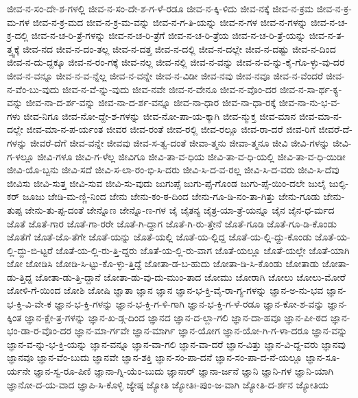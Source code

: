{ಜೀವ-ನ-ಸಂ-ದೇ-ಶ-ಗಳಲ್ಲಿ
ಜೀವ-ನ-ಸಂ-ದೇ-ಶ-ಗ-ಳೆ-ರಡೂ
ಜೀವ-ನ-ಕ್ಕಿ-ಳಿದು
ಜೀವ-ನಕ್ಕೆ
ಜೀವ-ನ-ಕ್ರಮ
ಜೀವ-ನ-ಕ್ರ-ಮ-ಗಳ
ಜೀವ-ನ-ಕ್ರ-ಮದ
ಜೀವ-ನ-ಕ್ರ-ಮ-ವನ್ನು
ಜೀವ-ನ-ಗ-ತಿ-ಯನ್ನು
ಜೀವ-ನ-ಗಳ
ಜೀವ-ನ-ಗಳನ್ನು
ಜೀವ-ನ-ಚ-ಕ್ರ-ದಲ್ಲಿ
ಜೀವ-ನ-ಚ-ರಿ-ತ್ರೆ-ಗಳನ್ನು
ಜೀವ-ನ-ಚ-ರಿ-ತ್ರೆಗೆ
ಜೀವ-ನ-ಚ-ರಿ-ತ್ರೆಯ
ಜೀವ-ನ-ಚ-ರಿ-ತ್ರೆ-ಯನ್ನು
ಜೀವ-ನ-ತ-ತ್ತ್ವಕ್ಕೆ
ಜೀವ-ನದ
ಜೀವ-ನ-ದಂ-ತಲ್ಲ
ಜೀವ-ನ-ದತ್ತ
ಜೀವ-ನ-ದಲ್ಲಿ
ಜೀವ-ನ-ದಲ್ಲೇ
ಜೀವ-ನ-ದಷ್ಟು
ಜೀವ-ನ-ದಿಂದ
ಜೀವ-ನ-ದು-ದ್ದಕ್ಕೂ
ಜೀವ-ನ-ರಂ-ಗಕ್ಕೆ
ಜೀವ-ನಲ್ಲ
ಜೀವ-ನಲ್ಲಿ
ಜೀವ-ನ-ವನ್ನು
ಜೀವ-ನ-ವ-ನ್ನು-ಕೈ-ಗೊ-ಳ್ಳು-ವು-ದರ
ಜೀವ-ನ-ವನ್ನೂ
ಜೀವ-ನ-ವ-ನ್ನೆಲ್ಲ
ಜೀವ-ನ-ವನ್ನೇ
ಜೀವ-ನ-ವಿಡೀ
ಜೀವ-ನವು
ಜೀವ-ನವೂ
ಜೀವ-ನ-ವೆಂದರೆ
ಜೀವ-ನ-ವೆಂ-ಬು-ವುದು
ಜೀವ-ನ-ವೆ-ನ್ನು-ವುದು
ಜೀವ-ನವೇ
ಜೀವ-ನ-ವೇನೂ
ಜೀವ-ನ-ವೊಂ-ದರ
ಜೀವ-ನ-ಸಾ-ರ್ಥ-ಕ್ಯ-ವನ್ನು
ಜೀವ-ನಾ-ದ-ರ್ಶ-ವನ್ನು
ಜೀವ-ನಾ-ದ-ರ್ಶ-ವನ್ನೂ
ಜೀವ-ನಾ-ಧಾರ
ಜೀವ-ನಾ-ಧಾ-ರಕ್ಕೆ
ಜೀವ-ನಾ-ನು-ಭ-ವ-ಗಳು
ಜೀವ-ನಿಗೂ
ಜೀವ-ನೋ-ದ್ದೇ-ಶ-ಗಳನ್ನು
ಜೀವ-ನೋ-ಪಾ-ಯ-ಕ್ಕಾಗಿ
ಜೀವ-ನ್ಮುಕ್ತ
ಜೀವ-ಮಾನ
ಜೀವ-ಮಾ-ನ-ದಲ್ಲೇ
ಜೀವ-ಮಾ-ನ-ಪ-ರ್ಯಂತ
ಜೀವರ
ಜೀವ-ರಂತೆ
ಜೀವ-ರಲ್ಲಿ
ಜೀವ-ರಲ್ಲೂ
ಜೀವ-ರಾ-ದರೆ
ಜೀವ-ರಿಗೆ
ಜೀವರೆ-ದೆ-ಗಳನ್ನು
ಜೀವರೆ-ದೆಗೆ
ಜೀವ-ವನ್ನೇ
ಜೀವವು
ಜೀವ-ಸ-ತ್ವ-ದಂತೆ
ಜೀವಾ-ತ್ಮನು
ಜೀವಾ-ತ್ಮನೂ
ಜೀವಿ
ಜೀವಿ-ಗಳನ್ನು
ಜೀವಿ-ಗ-ಳಲ್ಲೂ
ಜೀವಿ-ಗಳೂ
ಜೀವಿ-ಗ-ಳೆಲ್ಲ
ಜೀವಿಗೂ
ಜೀವಿ-ತಾ-ವ-ಧಿಯ
ಜೀವಿ-ತಾ-ವ-ಧಿ-ಯಲ್ಲಿ
ಜೀವಿ-ತಾ-ವ-ಧಿ-ಯಿಡೀ
ಜೀವಿ-ಯೊ-ಬ್ಬನು
ಜೀವಿ-ಸದೆ
ಜೀವಿ-ಸ-ಲಾ-ರಂ-ಭಿ-ಸಿ-ದರು
ಜೀವಿ-ಸಿ-ದ-ವ-ರಲ್ಲ
ಜೀವಿ-ಸಿ-ದ-ವರು
ಜೀವಿ-ಸಿ-ದೆವು
ಜೀವಿಸು
ಜೀವಿ-ಸುತ್ತ
ಜೀವಿ-ಸುವ
ಜೀವಿ-ಸು-ವುದು
ಜುಗುಪ್ಸೆ
ಜುಗು-ಪ್ಸೆ-ಗೊಂಡ
ಜುಗು-ಪ್ಸೆ-ಯಿಂ-ದಲೇ
ಜುಲೈ
ಜುಲ್ಫಿ-ಕರ್
ಜೂಜು
ಜೇಡಿ-ಮ-ಣ್ಣಿ-ನಿಂದ
ಜೇನು
ಜೇನು-ಕಂ-ಠ-ದಿಂದ
ಜೇನು-ಗೂ-ಡಿ-ನಂ-ತಾ-ಗಿತ್ತು
ಜೇನು-ಗೂಡು
ಜೇನು-ತುಪ್ಪ
ಜೇನು-ತು-ಪ್ಪ-ದಂತೆ
ಜೇನ್ನೊಣ
ಜೇನ್ನೊ-ಣ-ಗಳ
ಜೈ
ಜೈತನ್ಯ
ಜೈತ್ರ-ಯಾ-ತ್ರೆ-ಯನ್ನೂ
ಜೈನ
ಜೈನ-ಧ-ರ್ಮದ
ಜೊತೆ
ಜೊತೆ-ಗಾರ
ಜೊತೆ-ಗಾ-ರರೇ
ಜೊತೆ-ಗಿ-ದ್ದಾಗ
ಜೊತೆ-ಗಿ-ರು-ತ್ತೇನೆ
ಜೊತೆ-ಗೂಡಿ
ಜೊತೆ-ಗೂ-ಡಿ-ಕೊಂಡು
ಜೊತೆಗೆ
ಜೊತೆ-ಜೊ-ತೆಗೇ
ಜೊತೆ-ಯನ್ನು
ಜೊತೆ-ಯಲ್ಲಿ
ಜೊತೆ-ಯ-ಲ್ಲಿದ್ದ
ಜೊತೆ-ಯ-ಲ್ಲಿ-ದ್ದು-ಕೊಂಡು
ಜೊತೆ-ಯ-ಲ್ಲಿ-ದ್ದು-ಬಿ-ಟ್ಟರೆ
ಜೊತೆ-ಯ-ಲ್ಲಿ-ರು-ತ್ತಿ-ದ್ದರು
ಜೊತೆ-ಯ-ಲ್ಲಿ-ರು-ವಾಗ
ಜೊತೆ-ಯಲ್ಲೂ
ಜೊತೆ-ಯಲ್ಲೇ
ಜೊತೆ-ಯಾಗಿ
ಜೋ
ಜೋಡಿಸಿ
ಜೋಡಿ-ಸಿ-ಟ್ಟು-ಕೊ-ಳ್ಳು-ತ್ತಿದ್ದೆ
ಜೋತಾ-ಡ-ಬ-ಹುದು
ಜೋತಾ-ಡಿ-ಸಿ-ಕೊಂಡು
ಜೋತಾಡು
ಜೋತಾ-ಡು-ತ್ತಿದ್ದ
ಜೋತಾ-ಡು-ತ್ತಿ-ದ್ದಾನೆ
ಜೋತಾ-ಡು-ವು-ದು-ಮುಂ-ತಾದ
ಜೋಮು
ಜೋರಾಗಿ
ಜೋಲು
ಜೋಲು-ಮೋರೆ
ಜೋಳಿ-ಗೆ-ಯಿಂದ
ಜೋಶಿ
ಜೋಷಿ
ಜ್ಞಾತಾ
ಜ್ಞಾನ
ಜ್ಞಾನ
ಜ್ಞಾನ-ಭ-ಕ್ತಿ-ವೈ-ರಾ-ಗ್ಯ-ಗಳನ್ನು
ಜ್ಞಾನ-ಅ-ನು-ಭವ
ಜ್ಞಾನ-ಭ-ಕ್ತಿ-ವಿ-ವೇ-ಕ
ಜ್ಞಾನ-ಭ-ಕ್ತಿ-ಗಳನ್ನು
ಜ್ಞಾನ-ಭ-ಕ್ತಿ-ಗ-ಳಿ-ಗಾಗಿ
ಜ್ಞಾನ-ಭ-ಕ್ತಿ-ಗ-ಳೆ-ರಡೂ
ಜ್ಞಾನ-ಕೋ-ಶ-ವನ್ನು
ಜ್ಞಾನ-ಕ್ಕಿಂತ
ಜ್ಞಾನ-ಕ್ಷೇ-ತ್ರ-ಗಳನ್ನು
ಜ್ಞಾನ-ಖ-ಡ್ಗ-ದಿಂದ
ಜ್ಞಾನದ
ಜ್ಞಾನ-ದ-ಲ್ಲಾ-ಗಲಿ
ಜ್ಞಾನ-ದಾ-ಹವೂ
ಜ್ಞಾನ-ಪೀ-ಠದ
ಜ್ಞಾನ-ಭಂ-ಡಾ-ರ-ವೊಂ-ದರ
ಜ್ಞಾನ-ಮಾ-ರ್ಗವೇ
ಜ್ಞಾನ-ಮಾರ್ಗಿ
ಜ್ಞಾನ-ಯೋಗ
ಜ್ಞಾನ-ಯೋ-ಗಿ-ಗ-ಳಾ-ದರೂ
ಜ್ಞಾನ-ವನ್ನು
ಜ್ಞಾನ-ವ-ನ್ನು-ಭ-ಕ್ತಿ-ಯನ್ನು
ಜ್ಞಾನ-ವನ್ನೂ
ಜ್ಞಾನ-ವಾ-ಗಲಿ
ಜ್ಞಾನ-ವಾ-ದರೆ
ಜ್ಞಾನ-ವಿತ್ತು
ಜ್ಞಾನ-ವಿ-ದ್ದ-ವರು
ಜ್ಞಾನವು
ಜ್ಞಾನವೂ
ಜ್ಞಾನ-ವೆಂ-ಬುದು
ಜ್ಞಾನವೇ
ಜ್ಞಾನ-ಶಕ್ತಿ
ಜ್ಞಾನ-ಸಂ-ಪಾ-ದನೆ
ಜ್ಞಾನ-ಸಂ-ಪಾ-ದ-ನೆ-ಯಲ್ಲೂ
ಜ್ಞಾನ-ಸೂ-ರ್ಯನೇ
ಜ್ಞಾನ-ಸ್ವ-ರೂ-ಪಿಣಿ
ಜ್ಞಾನಾ-ಗ್ನಿ-ಯೆಂ-ಬುದು
ಜ್ಞಾನಾರ್
ಜ್ಞಾನಾ-ರ್ಜನೆ
ಜ್ಞಾನಿ
ಜ್ಞಾನಿ-ಗಳ
ಜ್ಞಾನಿ-ಯಾಗಿ
ಜ್ಞಾನೋ-ದ-ಯ-ವಾದ
ಜ್ಞಾಪಿ-ಸಿ-ಕೊಳ್ಳಿ
ಜ್ಯೇಷ್ಠ
ಜ್ಯೋತಿ
ಜ್ಯೋತಿಃ-ಪುಂ-ಜ-ವಾಗಿ
ಜ್ಯೋತಿ-ದ-ರ್ಶನ
ಜ್ಯೋತಿಯ
}
